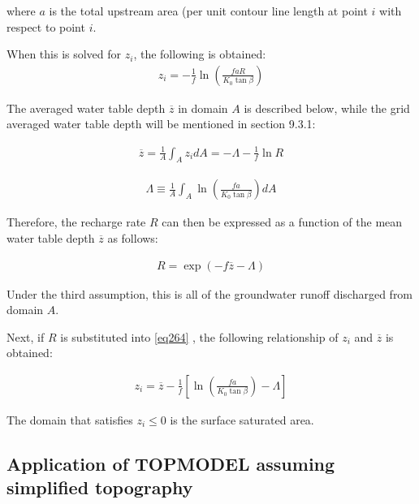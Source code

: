 where \(a\) is the total upstream area (per unit contour line length at point \(i\) with respect to point \(i\).

When this is solved for \(z_i\), the following is obtained: \begin{eqnarray}
z_i = -\frac{1}{f} \ln \left( \frac{faR}{K_0 \tan \beta}\right)  \label{eq264}
\end{eqnarray}

The averaged water table depth \(\overline{z}\) in domain \(A\) is described below, while the grid averaged water table depth will be mentioned in section 9.3.1:

\begin{eqnarray}
\overline{z} = \frac1{A}\int_{A} z_i dA
  = - \Lambda - \frac1{f} \ln R  \label{eq265}
\end{eqnarray}

\begin{eqnarray}
\Lambda \equiv
  \frac1{A}\int_{A} \ln \left( \frac{fa}{K_0 \tan \beta}\right) dA  \label{eq266}
\end{eqnarray}

Therefore, the recharge rate \(R\) can then be expressed as a function of the mean water table depth \(\overline{z}\) as follows:

\begin{eqnarray}
R = \exp (-f \overline{z} -\Lambda)  \label{eq267}
\end{eqnarray}

Under the third assumption, this is all of the groundwater runoff discharged from domain \(A\).

Next, if \(R\) is substituted into \ref{eq264} , the following relationship of \(z_i\) and \(\overline{z}\) is obtained:

\begin{eqnarray}
 z_i = \overline{z} - \frac{1}{f} \left[
\ln \left( \frac{fa}{K_0 \tan \beta}\right) - \Lambda
\right]  \label{eq268}
\end{eqnarray}

The domain that satisfies \(z_i \leq 0\) is the surface saturated area.

\hypertarget{application-of-topmodel-assuming-simplified-topography}{%
\subsection{Application of TOPMODEL assuming simplified topography}\label{application-of-topmodel-assuming-simplified-topography}}

